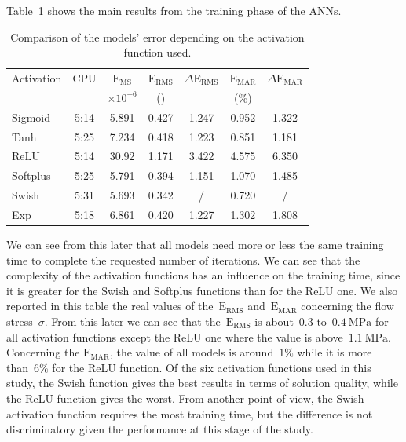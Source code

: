\documentclass[algorithms,article,submit,pdftex,oneauthors]{Definitions/mdpi}
\DeclareRobustCommand{\MSE}{\text{E}_\text{MS}}
\DeclareRobustCommand{\RMSE}{\text{E}_\text{RMS}}
\DeclareRobustCommand{\MARE}{\text{E}_\text{MAR}}
\DeclareRobustCommand{\MPa}{\text{MPa}}
\begin{document}
Table~\ref{tab:Training} shows the main results from the training phase of the ANNs.
\begin{table}[h!]
\caption{Comparison of the models' error depending on the activation function used.\label{tab:Training}}
\begin{tabular}{l|c|c|cc|cc}
\toprule
Activation & CPU & $\MSE$ & $\RMSE$ & $\Delta\RMSE$ & $\MARE$ & $\Delta\MARE$ \\
 & & $\times 10^{-6}$ & (\MPa) & & (\%) &\\ \midrule
Sigmoid & 5:14 & 5.891 & 0.427 & 1.247 & 0.952 & 1.322\\
Tanh & 5:25 & 7.234 & 0.418 & 1.223 & 0.851 & 1.181\\
ReLU & 5:14 & 30.92 & 1.171 & 3.422 & 4.575 & 6.350\\
Softplus & 5:25 & 5.791 & 0.394 & 1.151 & 1.070 & 1.485\\
Swish & 5:31 & 5.693 & 0.342 & / &0.720 & / \\
Exp & 5:18 & 6.861 & 0.420 & 1.227 & 1.302 & 1.808\\
\bottomrule
\end{tabular}
\end{table}
We can see from this later that all models need more or less the same training time to complete the requested number of iterations.
We can see that the complexity of the activation functions has an influence on the training time, since it is greater for the Swish and Softplus functions than for the ReLU one.
We also reported in this table the real values of the~$\RMSE$ and~$\MARE$ concerning the flow stress~$\sigma$.
From this later we can see that the~$\RMSE$ is about~$0.3$ to~$0.4~\MPa$ for all activation functions except the ReLU one where the value is above~$1.1~\MPa$.
Concerning the $\MARE$, the value of all models is around~$1\%$ while it is more than~$6\%$ for the ReLU function.
Of the six activation functions used in this study, the Swish function gives the best results in terms of solution quality, while the ReLU function gives the worst.
From another point of view, the Swish activation function requires the most training time, but the difference is not discriminatory given the performance at this stage of the study.
\end{document}
